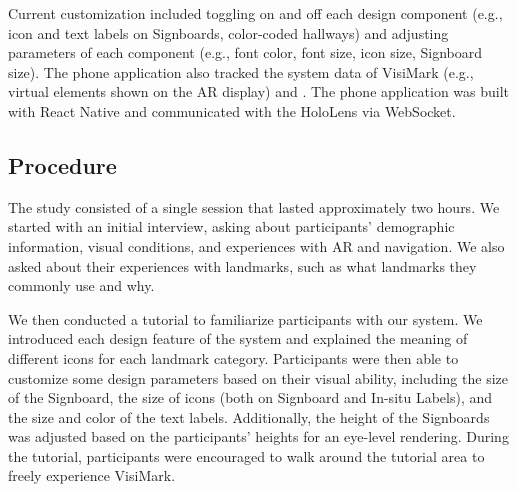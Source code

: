 Current customization included toggling on and off each design component (e.g., icon and text labels on Signboards, color-coded hallways) and adjusting parameters of each component (e.g., font color, font size, icon size, Signboard size).  The phone application also tracked the system data of VisiMark (e.g., virtual elements shown on the AR display) and . The phone application was built with React Native and communicated with the HoloLens via WebSocket. 



\subsection{Procedure}
The study consisted of a single session that lasted approximately two hours. We started with an initial interview, asking about participants' demographic information, visual conditions, and experiences with AR and navigation. We also asked about their experiences with landmarks, such as what landmarks they commonly use and why.

We then conducted a tutorial to familiarize participants with our system. We introduced each design feature of the system and explained the meaning of different icons for each landmark category. Participants were then able to customize some design parameters based on their visual ability, including the size of the Signboard, the size of icons (both on Signboard and In-situ Labels), and the size and color of the text labels. Additionally, the height of the Signboards was adjusted based on the participants' heights for an eye-level rendering. During the tutorial, participants were encouraged to walk around the tutorial area to freely experience VisiMark.

